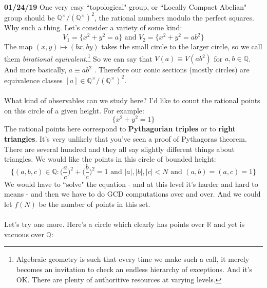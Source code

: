 \documentclass[12pt]{article}
\begin{document}
\newpage


\noindent \textbf{01/24/19} One very easy ``topological" group, or ``Locally Compact Abelian" group should be $\mathbb{Q}^\times/(\mathbb{Q}^\times)^2$, the rational numbers modulo the perfect squares.  Why such a thing.  Let's consider a variety of some kind:
$$ V_1  = \{ x^2 + y^2 = a \}  \text{ and } V_2 = \{ x^2 + y^2 = ab^2 \}$$
The map $(x,y) \mapsto (bx,by)$ takes the small circle to the larger circle, so we call them \textit{birational equivalent}.\footnote{Algebraic geometry is such that every time we make such a call, it merely becomes an invitation to check an endless hierarchy of exceptions.  And it's OK.  There are plenty of authoritive resources at varying levels.}  So we can say that $V(a) \equiv V(ab^2)$ for $a,b \in \mathbb{Q}$.  And more basically, $a  \equiv ab^2$ .  Therefore our conic sections (mostly circles) are equivalence classes $[a] \in \mathbb{Q}^\times/(\mathbb{Q}^\times)^2$. \\ \\
What kind of observables can we study here?  I'd like to count the rational points on this circle of a given height.  For example:
$$ \{ x^2 + y^2 = 1 \} $$
The rational points here correspond to \textbf{Pythagorian triples}  or to \textbf{right triangles}.  It's very unlikely that you've seen a proof of Pythagoras theorem.  There are several hundred and they all say slightly different things about triangles.  We would like the points in this circle of bounded height:
$$ \Big\{ (a,b,c) \in \mathbb{Q} : \Big( \frac{a}{c}\Big)^2 + \Big(\frac{b}{c}\Big)^2 = 1 \text{ and } |a|,|b|,|c| < N \text{ and } (a,b)=(a,c)=1\Big\} $$
We would have to ``solve" the equation - and at this level it's harder and hard to means - and then we have to do GCD computations over and over.  And we could let $f(N)$ be the number of points in this set.  \\ \\
Let's try one more.  Here's a circle which clearly has points over $\mathbb{R}$ and yet is vacuous over $\mathbb{Q}$:
\end{document}
